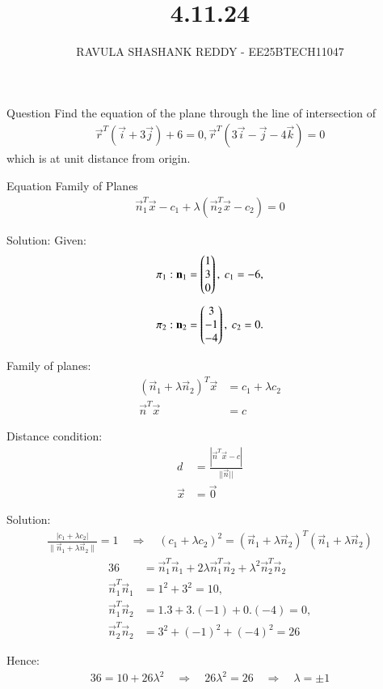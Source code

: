 \documentclass{beamer}
\title %
{4.11.24}
\author %
{RAVULA SHASHANK REDDY - EE25BTECH11047}
\begin{document}
	
	
	\frame{\titlepage}
	\begin{frame}{Question}
Find the equation of the plane through the line of intersection of
\begin{align*}
\vec{r}^T (\vec{i} + 3\vec{j}) + 6 = 0,
\vec{r}^T (3\vec{i} - \vec{j} - 4\vec{k}) = 0
\end{align*}
which is at unit distance from origin.\\

\end{frame}
\begin{frame}{Equation}
Family of Planes
\begin{align*}
    \vec{n}_1^T\vec{x} - c_1 +\lambda(\vec{n}_2^T\vec{x} - c_2)=0
\end{align*}
    
\end{frame}
\begin{frame}{Solution:}
Given:
\begin{align}
\pi_1 &: 
 \mathbf{n}_1=\begin{pmatrix}1\\3\\0\end{pmatrix}, \ c_1=-6, \\[1ex]
\pi_2 &: \mathbf{n}_2=\begin{pmatrix}3\\-1\\-4\end{pmatrix}, \ c_2=0.
\end{align}

Family of planes:
\begin{align}
(\vec{n}_1+\lambda\vec{n}_2)^T\vec{x}&=c_1+\lambda c_2\\
\vec{n}^T\vec{x}  &= c
\end{align}

Distance condition:
\begin{align}
d&=\frac{|\vec{n}^T\vec{x}-c|}{||\vec{n}||}\\
\vec{x}&=\vec{0}
\end{align}
\end{frame}
\begin{frame}{Solution:}
\begin{align}
\frac{|c_1+\lambda c_2|}{\|\vec{n}_1+\lambda\vec{n}_2\|}=1
\quad\Longrightarrow\quad
(c_1+\lambda c_2)^2=(\vec{n}_1+\lambda\vec{n}_2)^T(\vec{n}_1+\lambda\vec{n}_2)
\end{align}
\begin{align}
36&=\vec{n}_1^T\vec{n}_1+2\lambda\vec{n}_1^T\vec{n}_2+\lambda^2\vec{n}_2^T\vec{n}_2\\
\vec{n}_1^T\vec{n}_1&=1^2+3^2=10,\\
\vec{n}_1^T\vec{n}_2&=1.3+3.(-1)+0.(-4)=0,\\
\vec{n}_2^T\vec{n}_2&=3^2+(-1)^2+(-4)^2=26
\end{align}

Hence:
\begin{align}
36=10+26\lambda^2
\quad\Longrightarrow\quad
26\lambda^2=26
\quad\Longrightarrow\quad
\lambda=\pm1
\end{align}
\end{frame}
\end{document}
